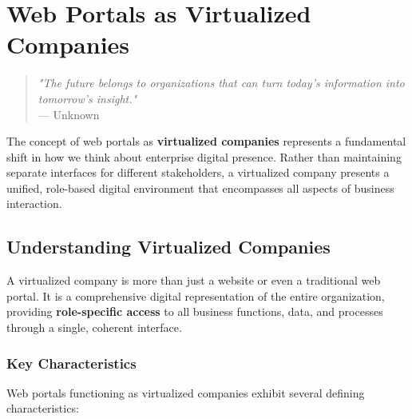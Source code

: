 
\chapter{Web Portals as Virtualized Companies}
\label{chap:virtualized-companies}

\begin{quote}
\textit{"The future belongs to organizations that can turn today's information into tomorrow's insight."} \\
— Unknown
\end{quote}

The concept of web portals as \textbf{virtualized companies} represents a fundamental shift in how we think about enterprise digital presence. Rather than maintaining separate interfaces for different stakeholders, a virtualized company presents a unified, role-based digital environment that encompasses all aspects of business interaction.

\section{Understanding Virtualized Companies}
\label{sec:understanding-virtualized}

A virtualized company is more than just a website or even a traditional web portal. It is a comprehensive digital representation of the entire organization, providing \textbf{role-specific access} to all business functions, data, and processes through a single, coherent interface.

\subsection{Key Characteristics}

Web portals functioning as virtualized companies exhibit several defining characteristics:

